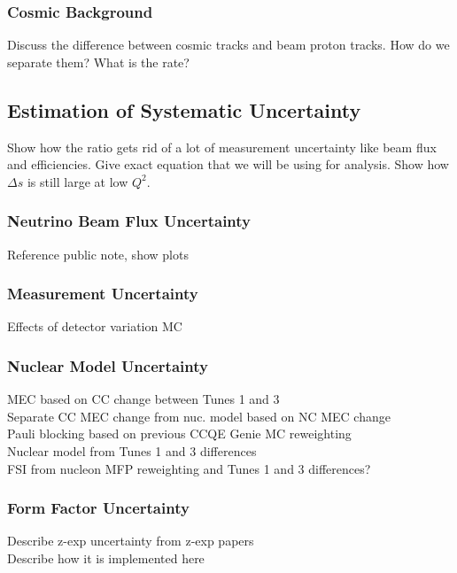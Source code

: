   \subsubsection{Cosmic Background}
    Discuss the difference between cosmic tracks and beam proton tracks. How do
    we separate them? What is the rate?


\subsection{Estimation of Systematic Uncertainty}\label{sec:systematics}
  Show how the ratio gets rid of a lot of measurement uncertainty like beam
  flux and efficiencies. Give exact equation that we will be using for
  analysis. Show how $\Delta s$ is still large at low $Q^2$.
  \subsubsection{Neutrino Beam Flux Uncertainty}\label{sec:fluxuncertainty}
    Reference public note, show plots
  \subsubsection{Measurement Uncertainty}\label{sec:detvar}
    Effects of detector variation MC
  \subsubsection{Nuclear Model Uncertainty}\label{sec:modeluncertainty}
    MEC based on CC change between Tunes 1 and 3 \\
    Separate CC MEC change from nuc. model based on NC MEC change \\
    Pauli blocking based on previous CCQE Genie MC reweighting \\
    Nuclear model from Tunes 1 and 3 differences \\
    FSI from nucleon MFP reweighting and Tunes 1 and 3 differences?
  \subsubsection{Form Factor Uncertainty}\label{sec:ffuncertainty}
    Describe z-exp uncertainty from z-exp papers \\
    Describe how it is implemented here


